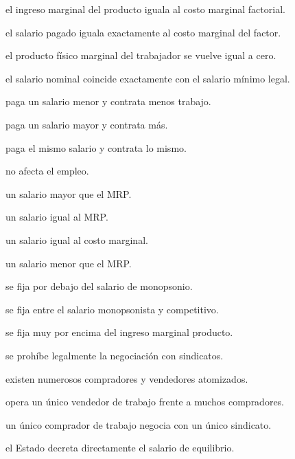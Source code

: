 \begin{opts}
    \item el ingreso marginal del producto iguala al costo marginal factorial.
    \item el salario pagado iguala exactamente al costo marginal del factor.
    \item el producto físico marginal del trabajador se vuelve igual a cero.
    \item el salario nominal coincide exactamente con el salario mínimo legal.
\end{opts}

\begin{opts}
    \item paga un salario menor y contrata menos trabajo.
    \item paga un salario mayor y contrata más.
    \item paga el mismo salario y contrata lo mismo.
    \item no afecta el empleo.
\end{opts}

\begin{opts}
    \item un salario mayor que el MRP.
    \item un salario igual al MRP.
    \item un salario igual al costo marginal.
    \item un salario menor que el MRP.
\end{opts}

\begin{opts}
    \item se fija por debajo del salario de monopsonio.
    \item se fija entre el salario monopsonista y competitivo.
    \item se fija muy por encima del ingreso marginal producto.
    \item se prohíbe legalmente la negociación con sindicatos.
\end{opts}

\begin{opts}
    \item existen numerosos compradores y vendedores atomizados.
    \item opera un único vendedor de trabajo frente a muchos compradores.
    \item un único comprador de trabajo negocia con un único sindicato.
    \item el Estado decreta directamente el salario de equilibrio.
\end{opts}

